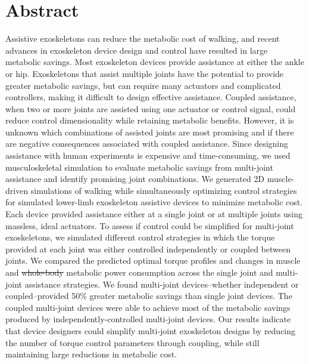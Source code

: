 \documentclass[10pt,letterpaper]{article}
\providecommand{\DIFaddtex}[1]{{\protect\color{blue}\uwave{#1}}} %
\providecommand{\DIFdeltex}[1]{{\protect\color{red}\sout{#1}}}                      %
\providecommand{\DIFaddbegin}{} %
\providecommand{\DIFaddend}{} %
\providecommand{\DIFdelbegin}{} %
\providecommand{\DIFdelend}{} %
\providecommand{\DIFadd}[1]{\texorpdfstring{\DIFaddtex{#1}}{#1}} %
\providecommand{\DIFdel}[1]{\texorpdfstring{\DIFdeltex{#1}}{}} %
\newcommand{\DIFscaledelfig}{0.5}
\newlength{\DIFdelgraphicswidth} %
\newlength{\DIFdelgraphicsheight} %
\newcommand{\DIFaddincludegraphics}[2][]{{\color{blue}\fbox{\DIFOincludegraphics[#1]{#2}}}} %
\newcommand{\DIFdelincludegraphics}[2][]{%
\sbox{\DIFdelgraphicsbox}{\DIFOincludegraphics[#1]{#2}}%
\settoboxwidth{\DIFdelgraphicswidth}{\DIFdelgraphicsbox} %
\settoboxtotalheight{\DIFdelgraphicsheight}{\DIFdelgraphicsbox} %
\scalebox{\DIFscaledelfig}{%
\parbox[b]{\DIFdelgraphicswidth}{\usebox{\DIFdelgraphicsbox}\\[-\baselineskip] \rule{\DIFdelgraphicswidth}{0em}}\llap{\resizebox{\DIFdelgraphicswidth}{\DIFdelgraphicsheight}{%
\setlength{\unitlength}{\DIFdelgraphicswidth}%
\begin{picture}(1,1)%
\thicklines\linethickness{2pt} %
{\color[rgb]{1,0,0}\put(0,0){\framebox(1,1){}}}%
{\color[rgb]{1,0,0}\put(0,0){\line( 1,1){1}}}%
{\color[rgb]{1,0,0}\put(0,1){\line(1,-1){1}}}%
\end{picture}%
}\hspace*{3pt}}} %
} %
\DeclareRobustCommand{\DIFaddbegin}{\DIFOaddbegin \let\includegraphics\DIFaddincludegraphics} %
\DeclareRobustCommand{\DIFaddend}{\DIFOaddend \let\includegraphics\DIFOincludegraphics} %
\DeclareRobustCommand{\DIFdelbegin}{\DIFOdelbegin \let\includegraphics\DIFdelincludegraphics} %
\DeclareRobustCommand{\DIFdelend}{\DIFOaddend \let\includegraphics\DIFOincludegraphics} %
\begin{document}
\section*{Abstract}
Assistive exoskeletons can reduce the metabolic cost of walking, and recent advances in exoskeleton device design and control have resulted in large metabolic savings. Most exoskeleton devices provide assistance at either the ankle or hip. Exoskeletons that assist multiple joints have the potential to provide greater metabolic savings, but can require many actuators and complicated controllers, making it difficult to design effective assistance. Coupled assistance, when two or more joints are assisted using one actuator or control signal, could reduce control dimensionality while retaining metabolic benefits. However, it is unknown which combinations of assisted joints are most promising and if there are negative consequences associated with coupled assistance. Since designing assistance with human experiments is expensive and time-consuming, we used musculoskeletal simulation to evaluate metabolic savings from multi-joint assistance and identify promising joint combinations. We generated 2D muscle-driven simulations of walking while simultaneously optimizing control strategies for simulated lower-limb exoskeleton assistive devices to minimize metabolic cost. Each device provided assistance either at a single joint or at multiple joints using massless, ideal actuators. To assess if control could be simplified for multi-joint exoskeletons, we simulated different control strategies in which the torque provided at each joint was either controlled independently or coupled between joints. We compared the predicted optimal torque profiles and changes in muscle and \DIFdelbegin \DIFdel{whole-body }\DIFdelend \DIFaddbegin \DIFadd{total }\DIFaddend metabolic power consumption across the single joint and multi-joint assistance strategies. We found multi-joint devices--whether independent or coupled--provided 50\% greater metabolic savings than single joint devices. The coupled multi-joint devices were able to achieve most of the metabolic savings produced by independently-controlled multi-joint devices. Our results indicate that device designers could simplify multi-joint exoskeleton designs by reducing the number of torque control parameters through coupling, while still maintaining large reductions in metabolic cost. 

\linenumbers
\end{document}
